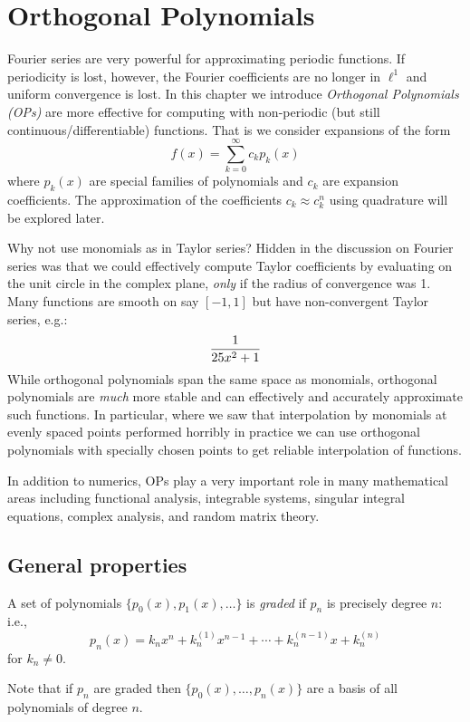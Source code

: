 
\section{Orthogonal Polynomials}
Fourier series are very powerful for approximating periodic functions. If periodicity is lost, however, the Fourier coefficients are no longer in $\ensuremath{\ell}^1$ and uniform convergence is lost. In this chapter we introduce \emph{Orthogonal Polynomials (OPs)} are more effective for computing with non-periodic (but still continuous/differentiable) functions. That is we consider expansions of the form
\[
f(x) = \sum_{k=0}^\ensuremath{\infty} c_k p_k(x)
\]
where $p_k(x)$ are special families of polynomials and $c_k$ are expansion coefficients. The approximation of the coefficients $c_k \ensuremath{\approx} c_k^n$ using quadrature will be explored later.

Why not use monomials as in Taylor series? Hidden in the discussion on Fourier series was that we could effectively compute Taylor coefficients by evaluating on the unit circle in the complex plane, \emph{only} if the radius of convergence was 1. Many functions are smooth on say $[-1,1]$ but have non-convergent Taylor series, e.g.:
\[
{1 \over 25x^2 + 1}
\]
While orthogonal polynomials span the same space as monomials, orthogonal polynomials are \emph{much} more stable and can effectively and accurately approximate such functions. In particular, where we saw that interpolation by monomials at evenly spaced points performed horribly in practice we can use orthogonal polynomials with specially chosen points to get reliable interpolation of functions. 

In addition to numerics, OPs play a very important role in many mathematical areas including functional analysis, integrable systems, singular integral equations, complex analysis, and random matrix theory.

\subsection{General properties}
\begin{definition} A set of polynomials $\{p_0(x), p_1(x), \ensuremath{\ldots} \}$ is \emph{graded} if $p_n$ is precisely degree $n$: i.e.,
\[
p_n(x) = k_n x^n + k_n^{(1)} x^{n-1} + \ensuremath{\cdots} + k_n^{(n-1)} x + k_n^{(n)}
\]
for $k_n \ensuremath{\neq} 0$. \end{definition}

Note that if $p_n$ are graded then $\{p_0(x), \ensuremath{\ldots}, p_n(x) \}$ are a basis of all polynomials of degree $n$.

